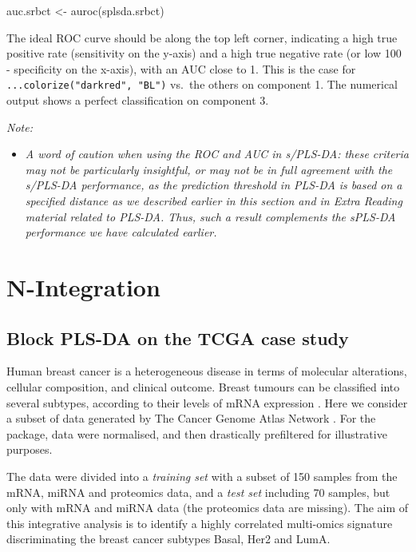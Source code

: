 \documentclass[
]{book}
\newenvironment{Shaded}{\begin{snugshade}}{\end{snugshade}}
\newcommand{\FunctionTok}[1]{\textcolor[rgb]{0.00,0.00,0.00}{#1}}
\newcommand{\NormalTok}[1]{#1}
\newcommand{\OtherTok}[1]{\textcolor[rgb]{0.56,0.35,0.01}{#1}}
\providecommand{\tightlist}{%
  \setlength{\itemsep}{0pt}\setlength{\parskip}{0pt}}
\begin{document}
\begin{Shaded}
\begin{Highlighting}[]
\NormalTok{auc.srbct }\OtherTok{\textless{}{-}} \FunctionTok{auroc}\NormalTok{(splsda.srbct)}
\end{Highlighting}
\end{Shaded}



The ideal ROC curve should be along the top left corner, indicating a high true positive rate (sensitivity on the y-axis) and a high true negative rate (or low 100 - specificity on the x-axis), with an AUC close to 1. This is the case for \texttt{...colorize("darkred",\ "BL")} vs.~the others on component 1. The numerical output shows a perfect classification on component 3.

\emph{Note:}

\begin{itemize}
\tightlist
\item
  \emph{A word of caution when using the ROC and AUC in s/PLS-DA: these criteria may not be particularly insightful, or may not be in full agreement with the s/PLS-DA performance, as the prediction threshold in PLS-DA is based on a specified distance as we described earlier in this section and in Extra Reading material related to PLS-DA. Thus, such a result complements the sPLS-DA performance we have calculated earlier.}
\end{itemize}

\hypertarget{nInte}{%
\chapter{N-Integration}\label{nInte}}

\hypertarget{nInte:blockplsda-tcga-case}{%
\section{Block PLS-DA on the TCGA case study}\label{nInte:blockplsda-tcga-case}}

Human breast cancer is a heterogeneous disease in terms of molecular alterations, cellular composition, and clinical outcome. Breast tumours can be classified into several subtypes, according to their levels of mRNA expression \citep{Sor01}. Here we consider a subset of data generated by The Cancer Genome Atlas Network \citep{TCGA12}. For the package, data were normalised, and then drastically prefiltered for illustrative purposes.

The data were divided into a \emph{training set} with a subset of 150 samples from the mRNA, miRNA and proteomics data, and a \emph{test set} including 70 samples, but only with mRNA and miRNA data (the proteomics data are missing). The aim of this integrative analysis is to identify a highly correlated multi-omics signature discriminating the breast cancer subtypes Basal, Her2 and LumA.
\end{document}
